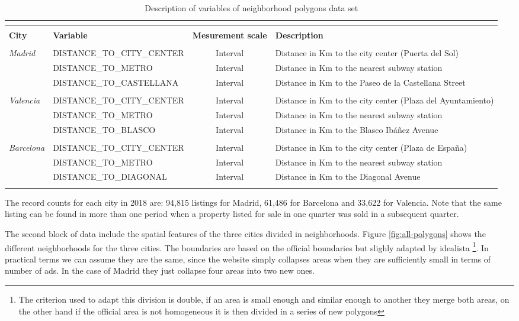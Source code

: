 \documentclass[times,final]{elsarticle}
\begin{document}
\begin{footnotesize}
\begin{longtable}{l p{35mm} c p{46mm}}
\caption{Description of variables of neighborhood polygons data set} \\
\label{table:data-distance-variables} \\
\hline
\hline
& & &\\
\textbf{City} & \textbf{Variable} & \textbf{Mesurement scale} & \textbf{Description}\\
\hline
& & &\\
\emph{Madrid} & DISTANCE\_TO\_CITY\_CENTER & Interval & Distance in Km to the city center (Puerta del Sol) \\ & DISTANCE\_TO\_METRO & Interval & Distance in Km to the nearest subway station \\ & DISTANCE\_TO\_CASTELLANA & Interval & Distance in Km to the Paseo de la Castellana Street \\
& & &\\
\emph{Valencia} & DISTANCE\_TO\_CITY\_CENTER & Interval & Distance in Km to the city center (Plaza del Ayuntamiento) \\ & DISTANCE\_TO\_METRO & Interval & Distance in Km to the nearest subway station \\
 & DISTANCE\_TO\_BLASCO & Interval & Distance in Km to the Blasco Ibáñez Avenue \\
& & &\\
\emph{Barcelona} & DISTANCE\_TO\_CITY\_CENTER & Interval & Distance in Km to the city center (Plaza de España) \\ & DISTANCE\_TO\_METRO & Interval & Distance in Km to the nearest subway station \\ & DISTANCE\_TO\_DIAGONAL & Interval & Distance in Km to the Diagonal Avenue \\
& & &\\
\hline
\hline
\hline
\end{longtable}
\end{footnotesize}

The record counts for each city in 2018 are: 94,815 listings for Madrid, 61,486 for Barcelona and 33,622 for Valencia. Note that the same listing can be found in more than one period when a property listed for sale in one quarter was sold in a subsequent quarter.

The second block of data include the spatial features of the three cities divided in neighborhoods. Figure \ref{fig:all-polygons} shows the different neighborhoods for the three cities. The boundaries are based on the official boundaries but slighly adapted by idealista \footnote{The criterion used to adapt this division is double, if an area is small enough and similar enough to another they merge both areas, on the other hand if the official area is not homogeneous it is then divided in a series of new polygons}. In practical terms we can assume they are the same, since the website simply collapses areas when they are sufficiently small in terms of number of ads. In the case of Madrid they just collapse four areas into two new ones.
\end{document}
